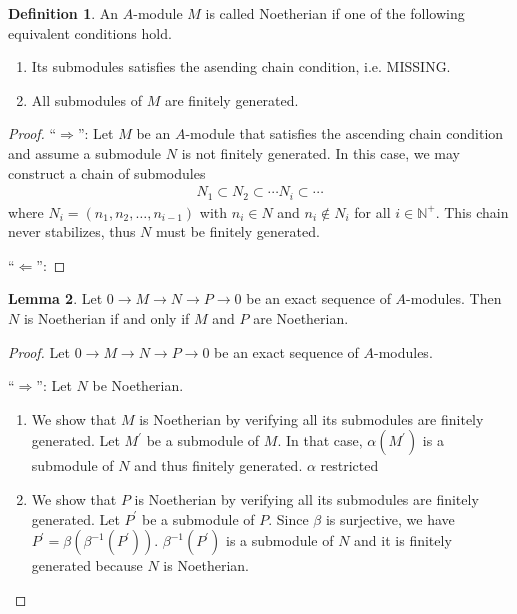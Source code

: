 \documentclass[a4paper]{book}
\theoremstyle{definition}
\newtheorem{definition}{Definition}[]
\newtheorem{lemma}[definition]{Lemma}
\begin{document}
\begin{defbox}
    \begin{definition}
        An \(A\)-module \(M\) is called Noetherian if one of the following equivalent conditions hold.
        \begin{enumerate}
            \item Its submodules satisfies the asending chain condition, i.e. MISSING.
            \item All submodules of \(M\) are finitely generated.
        \end{enumerate}
    \end{definition}
\end{defbox}

\begin{proof}
    ``\(\Rightarrow\)'': Let \(M\) be an \(A\)-module that satisfies the ascending chain condition and assume a submodule \(N\) is not finitely generated. In this case, we may construct a chain of submodules
    \begin{align*}
        N_1 \subset N_2 \subset \cdots N_i \subset \cdots
    \end{align*}
    where \(N_i = (n_1, n_2, \ldots, n_{i-1})\) with \(n_i \in N\) and \(n_i \not\in N_i\) for all \(i \in \mathbb{N}^+\). This chain never stabilizes, thus \(N\) must be finitely generated.

    \noindent``\(\Leftarrow\)'':
\end{proof}

\begin{thmbox}
    \begin{lemma}
        Let \(0 \rightarrow M \rightarrow N \rightarrow P \rightarrow 0\) be an exact sequence of \(A\)-modules. Then \(N\) is Noetherian if and only if \(M\) and \(P\) are Noetherian.
    \end{lemma}
\end{thmbox}
\begin{proof}
    Let \(0 \rightarrow M \rightarrow N \rightarrow P \rightarrow 0\) be an exact sequence of \(A\)-modules.

    \noindent ``\(\Rightarrow\)'': Let \(N\) be Noetherian.
    \begin{enumerate}
        \item We show that \(M\) is Noetherian by verifying all its submodules are finitely generated. Let \(M^\prime\) be a submodule of \(M\). In that case, \(\alpha(M^\prime)\) is a submodule of \(N\) and thus finitely generated. \(\alpha\) restricted 
        \item We show that \(P\) is Noetherian by verifying all its submodules are finitely generated. Let \(P^\prime\) be a submodule of \(P\). Since \(\beta\) is surjective, we have \(P^\prime = \beta \left(\beta^{-1}(P^\prime)\right)\). \(\beta^{-1}(P^\prime)\) is a submodule of \(N\) and it is finitely generated because \(N\) is Noetherian.
    \end{enumerate}
\end{proof}
\end{document}
